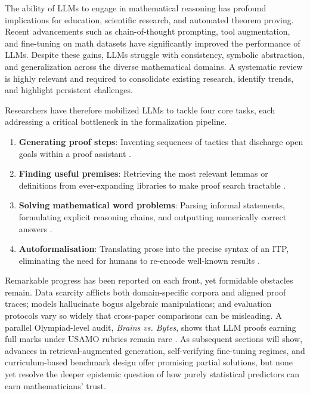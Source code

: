 \documentclass[acmsmall,anonymous]{acmart}
\begin{document}
The ability of LLMs to engage in mathematical reasoning has profound implications for education, scientific research, and automated theorem proving. Recent advancements such as chain-of-thought prompting, tool augmentation, and fine-tuning on math datasets have significantly improved the performance of LLMs. Despite these gains, LLMs struggle with consistency, symbolic abstraction, and generalization across the diverse mathematical domains. A systematic review is highly relevant and required to consolidate existing research, identify trends, and highlight persistent challenges. 

Researchers have therefore mobilized LLMs to tackle four core tasks, each addressing a critical bottleneck in the formalization pipeline.  
\begin{enumerate}
    \item \textbf{Generating proof steps}: Inventing sequences of tactics that discharge open goals within a proof assistant \cite{yang2023subgoalxl,xin2024deepseek,xin2023lego}.  
    \item \textbf{Finding useful premises}: Retrieving the most relevant lemmas or definitions from ever-expanding libraries to make proof search tractable \cite{yang-2023-leandojo,xin2024deepseek}.  
    \item \textbf{Solving mathematical word problems}: Parsing informal statements, formulating explicit reasoning chains, and outputting numerically correct answers \cite{frieder2023mathematical,chen2022program,gao2022pal,wei2022chain}.  
    \item \textbf{Autoformalisation}: Translating prose into the precise syntax of an ITP, eliminating the need for humans to re-encode well-known results \cite{wang2018first,wu2022autoformalization,murphy2024autoformalizing}.  
\end{enumerate}

Remarkable progress has been reported on each front, yet formidable obstacles remain.  Data scarcity afflicts both domain-specific corpora and aligned proof traces; models hallucinate bogus algebraic manipulations; and evaluation protocols vary so widely that cross-paper comparisons can be misleading. A parallel Olympiad-level audit, \emph{Brains vs. Bytes}, shows that LLM proofs earning full marks under USAMO rubrics remain rare \cite{mahdavi2025brainsvsbytes}.  As subsequent sections will show, advances in retrieval-augmented generation, self-verifying fine-tuning regimes, and curriculum-based benchmark design offer promising partial solutions, but none yet resolve the deeper epistemic question of how purely statistical predictors can earn mathematicians’ trust.
\end{document}
